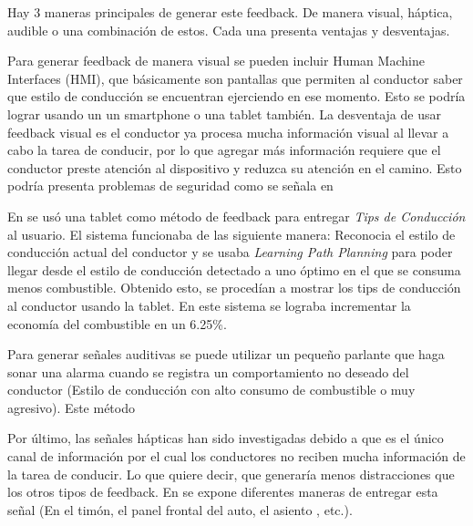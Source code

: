 Hay 3 maneras principales de generar este feedback. De manera visual, háptica, audible o una combinación de estos. Cada una presenta ventajas y desventajas.

Para generar feedback de manera visual se pueden incluir Human Machine Interfaces (HMI), que básicamente son pantallas que permiten al conductor saber que estilo de conducción se encuentran ejerciendo en ese momento. Esto se podría lograr usando un un smartphone o una tablet también. La desventaja de usar feedback visual es el conductor ya procesa mucha información visual al llevar a cabo la tarea de conducir, por lo que agregar más información requiere que el conductor preste atención al dispositivo  y reduzca su atención en el camino. Esto podría presenta problemas de seguridad como se señala en \cite{benedetto2012}

En \cite{8207769} se usó una tablet como método de feedback para entregar {\it Tips de Conducción} al usuario. El sistema funcionaba de las siguiente manera: Reconocia el estilo de conducción actual del conductor y se usaba {\it Learning Path Planning} para poder llegar desde el estilo de conducción detectado a uno óptimo en el que se consuma menos combustible. Obtenido esto, se procedían a mostrar los tips de conducción al conductor usando la tablet. En este sistema se lograba incrementar la economía del combustible en un 6.25\%.

Para generar señales auditivas se puede utilizar un pequeño parlante que haga sonar una alarma cuando se registra un comportamiento no deseado del conductor (Estilo de conducción con alto consumo de combustible o muy agresivo). Este método

Por último, las señales hápticas han sido investigadas debido a que es el único canal de información por el cual los conductores no reciben mucha información de la tarea de conducir. Lo que quiere decir, que generaría menos distracciones que los otros tipos de feedback. En \cite{Hapticreview} se expone diferentes maneras de entregar esta señal (En el timón, el panel frontal del auto, el asiento , etc.).



